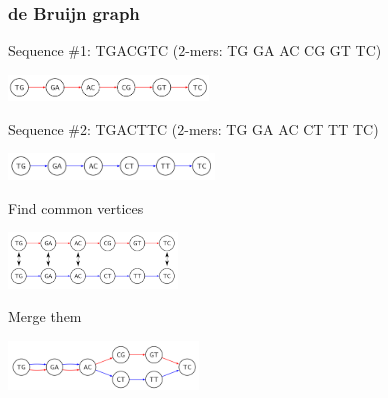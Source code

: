 
\begin{frame}
	\frametitle{de Bruijn graph}
	\centering
	  
  Sequence \#1: {\color{red}TGACGTC} ($2$-mers: {\color{red} TG GA AC CG GT TC})
                            
  \medskip

	\includegraphics[height=0.7cm]{images/debruin-0}

  \medskip
  
  Sequence \#2: {\color{blue}TGACTTC} ($2$-mers: {\color{blue} TG GA AC CT TT TC})
	
	\medskip
	
	\includegraphics[height=0.7cm]{images/debruin-1}
	
	\pause

	\medskip
	
	Find common vertices

	\medskip
  \includegraphics[height=1.5cm]{images/debruin-2}

	\pause
	                           
  \medskip
  
  Merge them
	\medskip

	\includegraphics[height=1.3cm]{images/debruin-3}


\end{frame}


